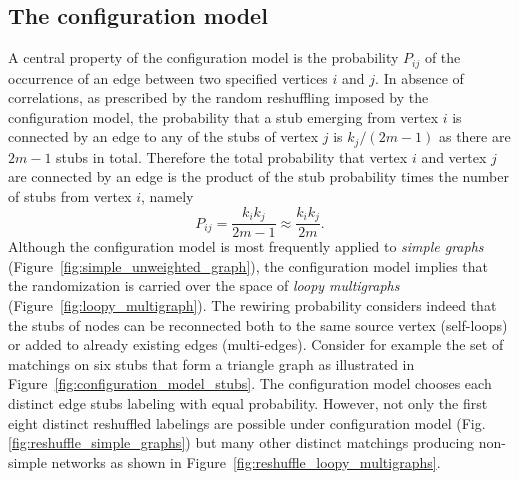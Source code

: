 \subsection{The configuration model}\label{sec:configuration_model}
A central property of the configuration model is the probability $P_{ij}$ of the occurrence of an edge between two specified vertices $i$ and $j$.
In absence of correlations, as prescribed by the random reshuffling imposed by the configuration model, the probability that a stub emerging from vertex $i$ is connected by an edge to any of the stubs of vertex $j$ is $k_j/(2m-1)$ as there are $2m-1$ stubs in total.
Therefore the total probability that vertex $i$ and vertex $j$ are connected by an edge is the product of the stub probability times the number of stubs from vertex $i$, namely 
\begin{equation}\label{eq:configuration_model_probability}
P_{ij} = \frac{k_i k_j}{2m-1} \approx \frac{k_i k_j}{2m}.
\end{equation}
Although the configuration model is most frequently applied to \emph{simple graphs} (Figure~\ref{fig:simple_unweighted_graph}), the configuration model implies that the randomization is carried over the space of \emph{loopy multigraphs} (Figure~\ref{fig:loopy_multigraph}).
The rewiring probability considers indeed that the stubs of nodes can be reconnected both to the same source vertex (self-loops) or added to already existing edges (multi-edges).
Consider for example the set of matchings on six stubs that form a triangle graph as illustrated in Figure~\ref{fig:configuration_model_stubs}. The configuration model chooses each distinct edge stubs labeling with equal probability. However, not only the first eight distinct reshuffled labelings are possible under configuration model (Fig.\ref{fig:reshuffle_simple_graphs}) but many other distinct matchings producing non-simple networks as shown in Figure~\ref{fig:reshuffle_loopy_multigraphs}.


